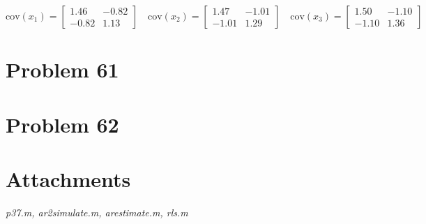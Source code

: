 \documentclass[a4paper, 11pt]{article}
\begin{document}
\begin{equation}
\text{cov}(x_1) = \begin{bmatrix}
1.46 & -0.82 \\
-0.82 & 1.13
\end{bmatrix} \quad \text{cov}(x_2) = \begin{bmatrix}
1.47 & -1.01 \\
-1.01 & 1.29
\end{bmatrix} \quad \text{cov}(x_3) = \begin{bmatrix}
1.50 & -1.10 \\
-1.10 & 1.36
\end{bmatrix}
\end{equation}




\section*{Problem 61}




\section*{Problem 62}




\section*{Attachments}
\textit{p37.m, ar2simulate.m, arestimate.m, rls.m}
\end{document}
